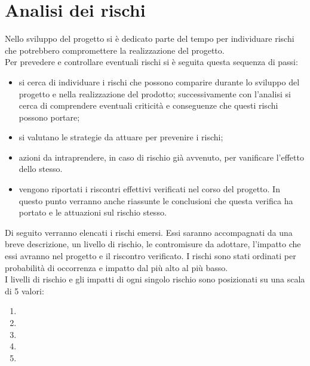 \section{Analisi dei rischi}
Nello sviluppo del progetto si è dedicato parte del tempo per individuare rischi che potrebbero compromettere la realizzazione del progetto.\\
Per prevedere e controllare eventuali rischi si è seguita questa sequenza di passi:
\begin{itemize}
\item {} si cerca di individuare i rischi che possono comparire durante lo sviluppo del progetto e nella realizzazione del prodotto; successivamente con l'analisi si cerca di comprendere eventuali criticità e conseguenze che questi rischi possono portare;
\item {} si valutano le strategie da attuare  per prevenire i rischi;
\item {} azioni da intraprendere, in caso di rischio già avvenuto, per vanificare l'effetto dello stesso.
\item {} vengono riportati i riscontri effettivi verificati nel corso del progetto. In questo punto verranno anche riassunte le conclusioni che questa verifica ha portato e le attuazioni sul rischio stesso. 
\end{itemize}
Di seguito verranno elencati i rischi emersi. Essi saranno accompagnati da una breve descrizione, un livello di rischio, le contromisure da adottare, l'impatto che essi avranno nel progetto e il riscontro verificato. I rischi sono stati ordinati per probabilità di occorrenza e impatto dal più alto al più basso.\\
I livelli di rischio e gli impatti di ogni singolo rischio sono posizionati su una scala di 5 valori:
\begin{enumerate}
\item {}
\item {}
\item {}
\item {}
\item {}
\end{enumerate}

